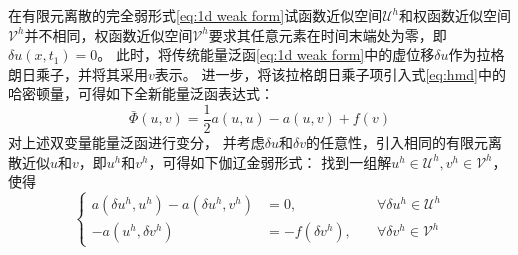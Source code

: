 在有限元离散的完全弱形式\eqref{eq:1d weak form}试函数近似空间$\mathcal{U}^h$和权函数近似空间$\mathcal{V}^h$并不相同，权函数近似空间$\mathcal V^h$要求其任意元素在时间末端处为零，即$\delta u(x,t_1)=0$。
此时，将传统能量泛函\eqref{eq:1d weak form}中的虚位移$\delta u$作为拉格朗日乘子，并将其采用$v$表示。
进一步，将该拉格朗日乘子项引入式\eqref{eq:hmd}中的哈密顿量，可得如下全新能量泛函表达式：
\begin{equation}\label{3.16}
\bar \Phi(u,v) = \frac{1}{2}a(u,u) - a(u,v) + f(v)
\end{equation}
对上述双变量能量泛函进行变分，
并考虑$\delta u$和$\delta v$的任意性，引入相同的有限元离散近似$u$和$v$，即$u^h$和$v^h$，可得如下伽辽金弱形式：
找到一组解$u^h \in \mathcal{U}^h, v^h \in \mathcal{V}^h$，使得
\begin{equation}\label{3.21}
    \left \{
    \begin{aligned}
        a(\delta u^h, u^h) - a(\delta u^h, v^h) &= 0, \quad & \forall \delta u^h \in \mathcal{U}^h \\
        -a(u^h, \delta v^h) &= -f(\delta v^h), \quad & \forall \delta v^h \in \mathcal{V}^h
    \end{aligned}
    \right .
\end{equation}

